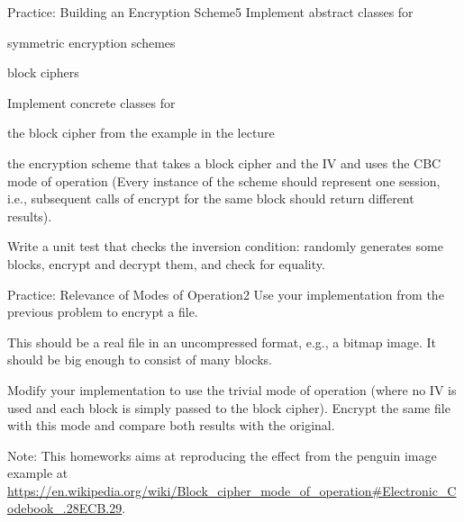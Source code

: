 \documentclass[a4paper]{article}
\begin{document}
\header

\begin{problem}{Practice: Building an Encryption Scheme}{5}
Implement abstract classes for
\begin{compactitem}
 \item symmetric encryption schemes
 \item block ciphers
\end{compactitem}

Implement concrete classes for
\begin{compactitem}
 \item the block cipher from the example in the lecture
 \item the encryption scheme that takes a block cipher and the IV and uses the CBC mode of operation (Every instance of the scheme should represent one session, i.e., subsequent calls of encrypt for the same block should return different results).
\end{compactitem} 

Write a unit test that checks the inversion condition: randomly generates some blocks, encrypt and decrypt them, and check for equality.
\end{problem}

\begin{problem}{Practice: Relevance of Modes of Operation}{2}
Use your implementation from the previous problem to encrypt a file.

This should be a real file in an uncompressed format, e.g., a bitmap image.
It should be big enough to consist of many blocks.

Modify your implementation to use the trivial mode of operation (where no IV is used and each block is simply passed to the block cipher).
Encrypt the same file with this mode and compare both results with the original.

Note: This homeworks aims at reproducing the effect from the penguin image example at \url{https://en.wikipedia.org/wiki/Block_cipher_mode_of_operation#Electronic_Codebook_.28ECB.29}.
\end{problem}
\end{document}
